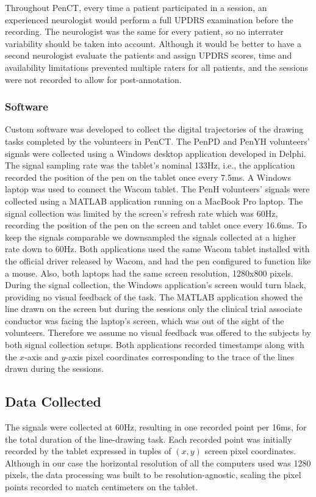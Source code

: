 Throughout \gls{PenCT}, every time a patient participated in a session, an experienced neurologist would perform a full \gls{UPDRS} examination before the recording. The neurologist was the same for every patient, so no interrater variability should be taken into account. Although it would be better to have a second neurologist evaluate the patients and assign \gls{UPDRS} scores, time and availability limitations prevented multiple raters for all patients, and the sessions were not recorded to allow for post-annotation.
  
\subsubsection{Software}
\label{subsubsec:PenCTSoftware}
Custom software was developed to collect the digital trajectories of the drawing tasks completed by the volunteers in \gls{PenCT}. The \gls{PenPD} and \gls{PenYH} volunteers' signals were collected using a Windows desktop application developed in Delphi. The signal sampling rate was the tablet's nominal 133Hz, i.e., the application recorded the position of the pen on the tablet once every 7.5ms. A Windows laptop was used to connect the Wacom tablet. The \gls{PenH} volunteers' signals were collected using a MATLAB application running on a MacBook Pro laptop. The signal collection was limited by the screen's refresh rate which was 60Hz, recording the position of the pen on the screen and tablet once every 16.6ms. To keep the signals comparable we downsampled the signals collected at a higher rate down to 60Hz. Both applications used the same Wacom tablet installed with the official driver released by Wacom, and had the pen configured to function like a mouse. Also, both laptops had the same screen resolution, 1280x800 pixels. During the signal collection, the Windows application's screen would turn black, providing no visual feedback of the task. The MATLAB application showed the line drawn on the screen but during the sessions only the clinical trial associate conductor was facing the laptop's screen, which was out of the sight of the volunteers. Therefore we assume no visual feedback was offered to the subjects by both signal collection setups. Both applications recorded timestamps along with the $x$-axis and $y$-axis pixel coordinates corresponding to the trace of the lines drawn during the sessions. 

\subsection{Data Collected}
\label{subsec:PenCTData}
The signals were collected at 60Hz, resulting in one recorded point per 16ms, for the total duration of the line-drawing task. Each recorded point was initially recorded by the tablet expressed in tuples of $(x,y)$ screen pixel coordinates. Although in our case the horizontal resolution of all the computers used was 1280 pixels, the data processing was built to be resolution-agnostic, scaling the pixel points recorded to match centimeters on the tablet. 

